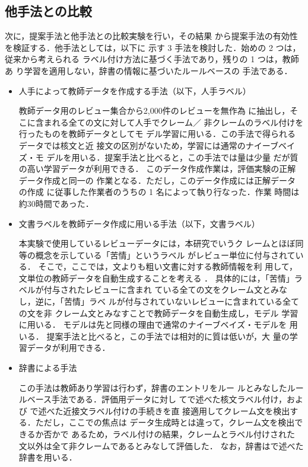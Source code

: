 \documentclass[japanese]{jnlp_1.4}
\def\sec#1{}
\begin{document}
\subsection{他手法との比較}
\label{sec:exp_base}

次に，提案手法と他手法との比較実験を行い，その結果
から提案手法の有効性を検証する．他手法としては，以下に
示す 3 手法を検討した．始めの 2 つは，従来から考えられる
ラベル付け方法に基づく手法であり，残りの 1 つは，教師あ
り学習を適用しない，辞書の情報に基づいたルールベースの
手法である．


\begin{itemize}
  \item 人手によって教師データを作成する手法（以下，人手ラベル）

教師データ用のレビュー集合から2,000件のレビューを無作為
に抽出し，そこに含まれる全ての文に対して人手でクレーム／
非クレームのラベル付けを行ったものを教師データとしてモ
デル学習に用いる．この手法で得られるデータでは核文と近
接文の区別がないため，学習には通常のナイーブベイズ・モ
デルを用いる．提案手法と比べると，この手法では量は少量
だが質の高い学習データが利用できる．
このデータ作成作業は，評価実験の正解データ作成と同一の
作業となる．ただし，このデータ作成には正解データの作成
に従事した作業者のうちの 1 名によって執り行なった．作業
時間は約30時間であった．

\item 文書ラベルを教師データ作成に用いる手法（以下，文書ラベル）

本実験で使用しているレビューデータには，本研究でいうク
レームとほぼ同等の概念を示している「苦情」というラベル
がレビュー単位に付与されている．
そこで，ここでは，文よりも粗い文書に対する教師情報を利
用して，文単位の教師データを自動生成することを考える
\cite{nigam2004a}．
具体的には，「苦情」ラベルが付与されたレビューに含まれ
ている全ての文をクレーム文とみなし，逆に，「苦情」ラベ
ルが付与されていないレビューに含まれている全ての文を非
クレーム文とみなすことで教師データを自動生成し，モデル
学習に用いる．
モデルは先と同様の理由で通常のナイーブベイズ・モデルを
用いる．
提案手法と比べると，この手法では相対的に質は低いが，大
量の学習データが利用できる．

\item 辞書による手法

この手法は教師あり学習は行わず，辞書のエントリをルー
ルとみなしたルールベース手法である．評価用データに対し
て\sec{data_core}で述べた核文ラベル付け，および
\sec{data_context}で述べた近接文ラベル付けの手続きを直
接適用してクレーム文を検出する．ただし，ここでの焦点は
データ生成時とは違って，クレーム文を検出できるか否かで
あるため，ラベル付けの結果，クレームとラベル付けされた
文以外は全て非クレームであるとみなして評価した．
なお，辞書は\sec{setting}で述べた辞書を用いる．

\end{itemize}
\end{document}
